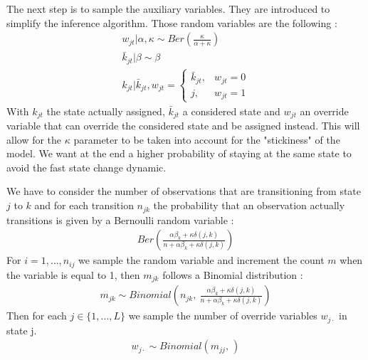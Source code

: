 The next step is to sample the auxiliary variables. They are introduced to simplify the inference algorithm. Those random variables are the following : \begin{align*}
	w_{jt}|\alpha, \kappa \sim Ber\left( \frac{\kappa}{\alpha+\kappa} \right) \\ 
	\bar k_{jt} | \beta \sim \beta 
	\\ 
	k_{jt} | \bar k_{jt} , w_{jt} = \begin{cases}
		\bar k_{jt}, & w_{jt} =0 \\ j, & w_{jt} =1
	\end{cases}
\end{align*}
With $k_{jt}$ the state actually assigned, $\bar k_{jt}$ a considered state and $w_{jt}$ an override variable that can override the considered state and be assigned instead. This will allow for the $\kappa$ parameter to be taken into account for the "stickiness" of the model. We want at the end a higher probability of staying at the same state to avoid the fast state change dynamic. 

We have to consider the number of observations that are transitioning from state $j$ to $k$ and for each transition $n_{jk}$ the probability that an observation actually transitions is given by a Bernoulli random variable :\begin{align*}
	Ber\left(\frac{\alpha\beta_k+\kappa\delta(j,k)}{n+ \alpha \beta_k+ \kappa \delta(j,k)} \right)
\end{align*}
For $i = 1,\dots,n_{ij}$ we sample the random variable and increment the count $m$ when the variable is equal to 1, then $m_{jk}$ follows a Binomial distribution :
\begin{align*}
		m_{jk} \sim Binomial\left(n_{jk},\:\frac{\alpha\beta_k+\kappa\delta(j,k)}{n+ \alpha \beta_k+ \kappa \delta(j,k)} \right)
\end{align*}
Then for each $j\in \{1,\dots,L\}$ we sample the number of override variables $w_{j\cdot}$ in state j. 
\begin{align*}
	w_{j\cdot}\sim Binomial\left( m_{jj}, \frac{}{} \right) 
\end{align*}

